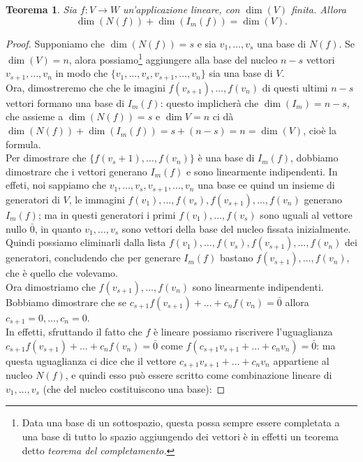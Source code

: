 \documentclass{book}
\newtheorem{teorema}{Teorema}
\begin{document}
\begin{teorema}
  Sia $f:V\to W$ un'applicazione lineare, con $\dim (V)$ finita. Allora
  \begin{equation}
    \dim (N(f))+\dim(I_m(f))=\dim(V).
  \end{equation}
\end{teorema}
\begin{proof}
  Supponiamo che $\dim(N(f))=s$ e sia $v_1,\dots,v_s$ una base di $N(f)$. Se $\dim (V)=n$, alora
  possiamo\footnote{Data una base di un sottospazio, questa possa sempre essere completata a una base di tutto
    lo spazio aggiungendo dei vettori è in effetti un teorema detto {\it teorema del completamento.}} aggiungere
  alla base del nucleo $n-s$ vettori $v_{s+1},\dots,v_n$ in modo che $\{v_1,\dots,v_s,v_{s+1},\dots,v_n\}$ sia una
  base di $V$.\\
  Ora, dimostreremo che che le imagini $f(v_{s+1}),\dots,f(v_n)$ di questi ultimi $n-s$ vettori formano una base
  di $I_m(f)$: questo implicherà che $\dim(I_m)=n-s$, che assieme a $\dim(N(f))=s$ e $\dim{V}=n$ ci dà
  $\dim(N(f))+\dim(I_m(f))=s+(n-s)=n=\dim(V)$, cioè la formula. \\
  Per dimostrare che $\{f(v_s+1),\dots,f(v_n)\}$ è una base di $I_m(f)$, dobbiamo dimostrare che i vettori
  generano $I_m(f)$ e sono linearmente indipendenti. In effeti, noi sappiamo che $v_1,\dots,v_s,v_{s+1},\dots,v_n$
  una base ee quind un insieme di generatori di $V$, le immagini $f(v_1),\dots,f(v_s),f(v_{s+1}),\dots,f(v_n)$
  generano $I_m(f)$; ma in questi generatori i primi $f(v_1),\dots,f(v_s)$ sono uguali al vettore nullo $\bar{0}$,
  in quanto $v_1,\dots,v_s$ sono vettori della base del nucleo fissata inizialmente. Quindi possiamo eliminarli
  dalla lista $f(v_1),\dots,f(v_s),f(v_{s+1}),\dots,f(v_n)$ dei generatori, concludendo che per generare $I_m(f)$
  bastano $f(v_{s+1}),\dots,f(v_n)$, che è quello che volevamo.\\
  Ora dimostriamo che $f(v_{s+1}),\dots,f(v_n)$ sono linearmente indipendenti. Bobbiamo dimostrare che se
  $c_{s+1}f(v_{s+1})+\dots+c_nf(v_n)=\bar{0}$ allora $c_{s+1}=0,\dots,c_n=0$.\\
  In effetti, sfruttando il fatto che $f$ è lineare possiamo riscrivere l'uguaglianza
  $c_{s+1}f(v_{s+1})+\dots+c_nf(v_n)=\bar{0}$ come $f(c_{s+1}v_{s+1}+\dots+c_nv_n)=\bar{0}$: ma questa uguaglianza ci
  dice che il vettore $c_{s+1}v_{s+1}+\dots+c_nv_n$ appartiene al nucleo $N(f)$, e quindi esso può essere scritto
  come combinazione lineare di $v_1,\dots,v_s$ (che del nucleo costituiscono una base):

\end{proof}
\end{document}
